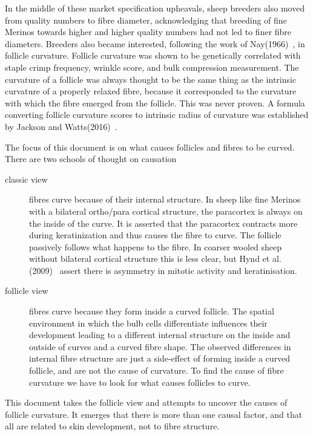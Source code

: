 \documentclass{article}
\begin{document}
In the middle of these market specification upheavals, sheep breeders also moved from quality numbers to fibre diameter, acknowledging that breeding of fine Merinos towards higher and higher quality numbers had not led to finer fibre diameters. Breeders also became interested, following the work of Nay(1966)~\cite{nay-1966}, in follicle curvature.  Follicle curvature was shown to be genetically correlated with staple crimp frequency, wrinkle score, and bulk compression measurement. The curvature of a follicle was always thought to be the same thing as the intrinsic curvature of a properly relaxed fibre, because it corresponded to the curvature with which the fibre emerged from the follicle. This was never proven. A formula converting follicle curvature scores to intrinsic radius of curvature was established by Jackson and Watts(2016)~\cite{jackson-2016}.

The focus of this document is on what causes follicles and fibres to be curved. There are two schools of thought on causation
\begin{description}
\item[classic view] fibres curve because of their internal structure. In sheep like fine Merinos with a bilateral ortho/para cortical structure, the paracortex is always on the inside of the curve. It is asserted that the paracortex contracts more during keratinization and thus causes the fibre to curve. The follicle passively follows what happens to the fibre. In coarser wooled sheep without bilateral cortical structure this is less clear, but Hynd et al. (2009)~\cite{hynd-2009} assert there is asymmetry in mitotic activity and keratinisation.
\item[follicle view] fibres curve because they form inside a curved follicle. The spatial environment in which the bulb cells differentiate influences their development leading to a different internal structure on the inside and outside of curves and a curved fibre shape.  The observed differences in internal fibre structure are just a side-effect of forming inside a curved follicle, and are not the cause of curvature. To find the cause of fibre curvature we have to look for what causes follicles to curve.  
\end{description}

This document takes the follicle view and attempts to uncover the causes of follicle curvature. It emerges that there is more than one causal factor, and that all are related to skin development, not to fibre structure.
\end{document}
